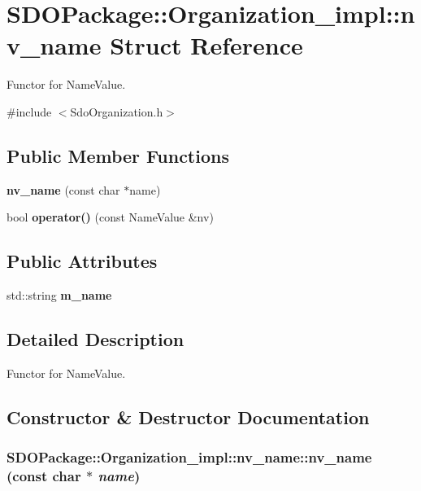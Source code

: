 \section{SDOPackage::Organization\_\-impl::nv\_\-name Struct Reference}
\label{structSDOPackage_1_1Organization__impl_1_1nv__name}


Functor for NameValue.  




{\ttfamily \#include $<$SdoOrganization.h$>$}

\subsection*{Public Member Functions}
\begin{DoxyCompactItemize}
\item 
{\bf nv\_\-name} (const char $\ast$name)
\item 
bool {\bf operator()} (const NameValue \&nv)
\end{DoxyCompactItemize}
\subsection*{Public Attributes}
\begin{DoxyCompactItemize}
\item 
std::string {\bf m\_\-name}
\end{DoxyCompactItemize}


\subsection{Detailed Description}
Functor for NameValue. 

\subsection{Constructor \& Destructor Documentation}
\subsubsection[{nv\_\-name}]{\setlength{\rightskip}{0pt plus 5cm}SDOPackage::Organization\_\-impl::nv\_\-name::nv\_\-name (const char $\ast$ {\em name})\hspace{0.3cm}{\ttfamily  [inline]}}\label{structSDOPackage_1_1Organization__impl_1_1nv__name_a36d18d35879c0f347b86b3c29f0f12fc}


